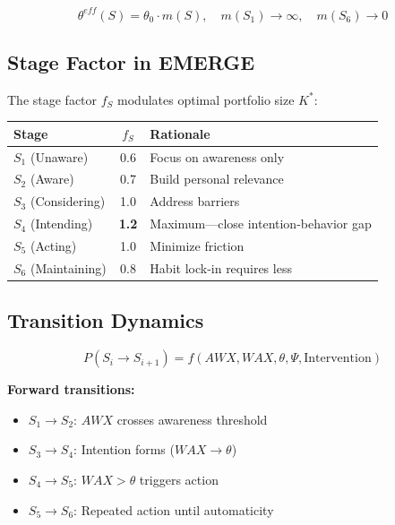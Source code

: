 \begin{equation}
\boxed{
\theta^{eff}(S) = \theta_0 \cdot m(S), \quad m(S_1) \to \infty, \quad m(S_6) \to 0
}
\label{eq:mp-theta-modulation}
\end{equation}

\subsection{Stage Factor in EMERGE}

The stage factor $f_S$ modulates optimal portfolio size $K^*$:

\begin{center}
\renewcommand{\arraystretch}{1.2}
\begin{tabular}{@{}lcl@{}}
\toprule
\textbf{Stage} & $f_S$ & \textbf{Rationale} \\
\midrule
$S_1$ (Unaware) & 0.6 & Focus on awareness only \\
$S_2$ (Aware) & 0.7 & Build personal relevance \\
$S_3$ (Considering) & 1.0 & Address barriers \\
$S_4$ (Intending) & \textbf{1.2} & Maximum---close intention-behavior gap \\
$S_5$ (Acting) & 1.0 & Minimize friction \\
$S_6$ (Maintaining) & 0.8 & Habit lock-in requires less \\
\bottomrule
\end{tabular}
\end{center}

\subsection{Transition Dynamics}

\begin{equation}
P(S_i \to S_{i+1}) = f(AWX, WAX, \theta, \Psi, \text{Intervention})
\label{eq:mp-transition}
\end{equation}

\textbf{Forward transitions:}
\begin{itemize}[nosep]
\item $S_1 \to S_2$: $AWX$ crosses awareness threshold
\item $S_3 \to S_4$: Intention forms ($WAX \to \theta$)
\item $S_4 \to S_5$: $WAX > \theta$ triggers action
\item $S_5 \to S_6$: Repeated action until automaticity
\end{itemize}

